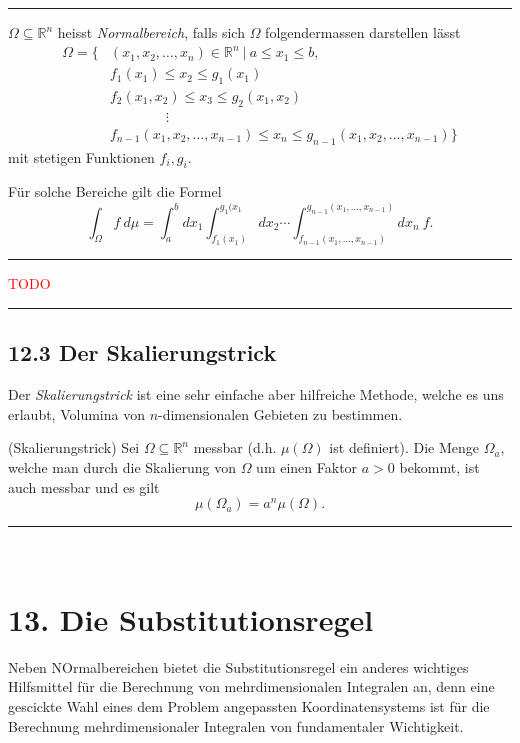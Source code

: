 \documentclass[a4paper,landscape,8pt]{extarticle}
\newcommand{\R}{\mathbb{R}}
\newcommand{\setsep}{\ \vert \ }
\newcommand{\todo}{\textcolor{red}{TODO }}
\newcommand{\sep}{\vspace{5pt}\noindent\hrule\vspace{5pt}}
\renewcommand*{\newpage}{ \ }
\begin{document}
\begin{multicols*}{4}
\sep

\Def $\Omega\subseteq\R^n$ heisst \emph{Normalbereich}, falls sich $\Omega$
folgendermassen darstellen lässt
\begin{align*}
\Omega = \{&(x_1,x_2,\ldots,x_n) \in \R^n \setsep a \leq x_1 \leq b,
\\
& f_1(x_1) \leq x_2 \leq g_1(x_1)
\\
& f_2(x_1,x_2) \leq x_3 \leq g_2(x_1,x_2)
\\
&\qquad\qquad\vdots
\\
& f_{n-1}(x_1,x_2,\ldots,x_{n-1}) \leq x_n \leq
g_{n-1}(x_1,x_2,\ldots,x_{n-1})
\}
\end{align*}
mit stetigen Funktionen $f_i,g_i$.

\Satz Für solche Bereiche gilt die Formel
\[
\int_\Omega f \ d\mu
=\int_a^b dx_1
\int_{f_1(x_1)}^{g_1(x_1} dx_2\cdots
\int_{f_{n-1}(x_1,\ldots,x_{n-1})}^{g_{n-1}(x_1,\ldots,x_{n-1})} dx_n \ f.
\]

\begin{warmup}
\sep

\Bsp \todo

\sep
\end{warmup}

\subsection{12.3 Der Skalierungstrick}

Der \emph{Skalierungstrick} ist eine sehr einfache aber hilfreiche Methode,
welche es uns erlaubt, Volumina von $n$-dimensionalen Gebieten zu bestimmen.

\Satz (Skalierungstrick) Sei $\Omega \subseteq \R^n$ messbar (d.h.
$\mu(\Omega)$ ist definiert). Die Menge $\Omega_a$, welche man durch die
Skalierung von $\Omega$ um einen Faktor $a>0$ bekommt, ist auch messbar und es
gilt
\[
\mu(\Omega_a) = a^n\mu(\Omega).
\]

\sep

\newpage

\section{13. Die Substitutionsregel}

Neben NOrmalbereichen bietet die Substitutionsregel ein anderes wichtiges
Hilfsmittel für die Berechnung von mehrdimensionalen Integralen an, denn eine
gescickte Wahl eines dem Problem angepassten Koordinatensystems ist für die
Berechnung mehrdimensionaler Integralen von fundamentaler Wichtigkeit.


\end{multicols*}
\end{document}
